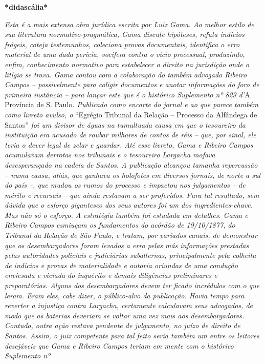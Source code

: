 \textbf{*didascália*}

\emph{Esta é a mais extensa obra jurídica escrita por Luiz Gama. Ao
melhor estilo de sua literatura normativo-pragmática, Gama discute
hipóteses, refuta indícios frágeis, coteja testemunhos, coleciona provas
documentais, identifica o erro material de uma dada perícia, vocifera
contra o vício processual, produzindo, enfim, conhecimento normativo
para estabelecer o direito na jurisdição onde o litígio se trava. Gama
contou com a colaboração do também advogado Ribeiro Campos --
possivelmente para coligir documentos e anotar informações do foro de
primeira instância -- para lançar este que é o histórico Suplemento nº
829 d'}A Província de S. Paulo\emph{. Publicado como encarte do jornal e
ao que parece também como livreto avulso, o} ``Egrégio Tribunal da
Relação -- Processo da Alfândega de Santos'' \emph{foi um divisor de
águas na tumultuada causa em que o tesoureiro da instituição era acusado
de roubar milhares de contos de réis -- que, por sinal, ele teria o
dever legal de zelar e guardar. Até esse livreto, Gama e Ribeiro Campos
acumulavam derrotas nos tribunais e o tesoureiro Largacha mofava
desesperançado na cadeia de Santos. A publicação alcançou tamanha
repercussão -- numa causa, aliás, que ganhava os holofotes em diversos
jornais, de norte a sul do país --, que mudou os rumos do processo e
impactou nos julgamentos -- de mérito e recursais -- que ainda restavam
a ser proferidos. Para tal resultado, sem dúvida que o esforço
gigantesco dos seus autores foi um dos ingredientes-chave. Mas não só o
esforço. A estratégia também foi estudada em detalhes. Gama e Ribeiro
Campos esmiuçam os fundamentos do acórdão de 19/10/1877, do Tribunal da
Relação de São Paulo, e tratam, por variados canais, de demonstrar que
os desembargadores foram levados a erro pelas más informações prestadas
pelas autoridades policiais e judiciárias subalternas, principalmente
pela colheita de indícios e provas de materialidade e autoria oriundas
de uma condução enviesada e viciada do inquérito e demais diligências
preliminares e preparatórias. Alguns dos desembargadores devem ter
ficado incrédulos com o que leram. Eram eles, cabe dizer, o público-alvo
da publicação. Havia tempo para reverter a injustiça contra Largacha,
certamente calculavam seus advogados, de modo que as baterias deveriam
se voltar uma vez mais aos desembargadores. Contudo, outra ação restava
pendente de julgamento, no juízo de direito de Santos. Assim, o juiz
competente para tal feito seria também um entre os leitores desejáveis
que Gama e Ribeiro Campos teriam em mente com o histórico Suplemento nº
}
